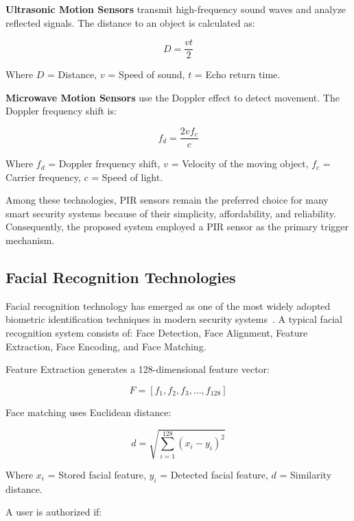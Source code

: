 \documentclass[12pt,a4paper,oneside]{report}
\begin{document}
\textbf{Ultrasonic Motion Sensors} transmit high-frequency sound waves and analyze reflected signals. The distance to an object is calculated as:

\begin{equation}
  D = \frac{vt}{2}
\end{equation}

Where $D$ = Distance, $v$ = Speed of sound, $t$ = Echo return time.

\textbf{Microwave Motion Sensors} use the Doppler effect to detect movement. The Doppler frequency shift is:

\begin{equation}
  f_d = \frac{2vf_c}{c}
\end{equation}

Where $f_d$ = Doppler frequency shift, $v$ = Velocity of the moving object, $f_c$ = Carrier frequency, $c$ = Speed of light.

Among these technologies, PIR sensors remain the preferred choice for many smart security systems because of their simplicity, affordability, and reliability. Consequently, the proposed system employed a PIR sensor as the primary trigger mechanism.

\subsection{Facial Recognition Technologies}

Facial recognition technology has emerged as one of the most widely adopted biometric identification techniques in modern security systems~\cite{ref7,ref16}. A typical facial recognition system consists of: Face Detection, Face Alignment, Feature Extraction, Face Encoding, and Face Matching.

Feature Extraction generates a 128-dimensional feature vector:

\begin{equation}
  F = [f_1, f_2, f_3, \ldots, f_{128}]
\end{equation}

Face matching uses Euclidean distance:

\begin{equation}
  d = \sqrt{\sum_{i=1}^{128}(x_i - y_i)^2}
\end{equation}

Where $x_i$ = Stored facial feature, $y_i$ = Detected facial feature, $d$ = Similarity distance.

A user is authorized if:
\end{document}
